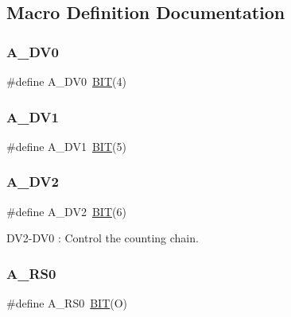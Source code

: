 \subsection{Macro Definition Documentation}
\hypertarget{group___serial_ga571fc22bdbbdc9a64d1592e217b11fcb}{}\label{group___serial_ga571fc22bdbbdc9a64d1592e217b11fcb} 
\subsubsection{\texorpdfstring{A\+\_\+\+D\+V0}{A\_DV0}}
{\footnotesize\ttfamily \#define A\+\_\+\+D\+V0~\hyperlink{group___serial_ga3a8ea58898cb58fc96013383d39f482c}{B\+IT}(4)}

\hypertarget{group___serial_ga4fc9b54f4673ed178656194a52c263c5}{}\label{group___serial_ga4fc9b54f4673ed178656194a52c263c5} 
\subsubsection{\texorpdfstring{A\+\_\+\+D\+V1}{A\_DV1}}
{\footnotesize\ttfamily \#define A\+\_\+\+D\+V1~\hyperlink{group___serial_ga3a8ea58898cb58fc96013383d39f482c}{B\+IT}(5)}

\hypertarget{group___serial_gaad3e83198dca553658658437932f878e}{}\label{group___serial_gaad3e83198dca553658658437932f878e} 
\subsubsection{\texorpdfstring{A\+\_\+\+D\+V2}{A\_DV2}}
{\footnotesize\ttfamily \#define A\+\_\+\+D\+V2~\hyperlink{group___serial_ga3a8ea58898cb58fc96013383d39f482c}{B\+IT}(6)}



D\+V2-\/\+D\+V0 \+: Control the counting chain. 

\hypertarget{group___serial_ga404efd521ab5b53976d3f8cae85db0de}{}\label{group___serial_ga404efd521ab5b53976d3f8cae85db0de} 
\subsubsection{\texorpdfstring{A\+\_\+\+R\+S0}{A\_RS0}}
{\footnotesize\ttfamily \#define A\+\_\+\+R\+S0~\hyperlink{group___serial_ga3a8ea58898cb58fc96013383d39f482c}{B\+IT}(O)}

